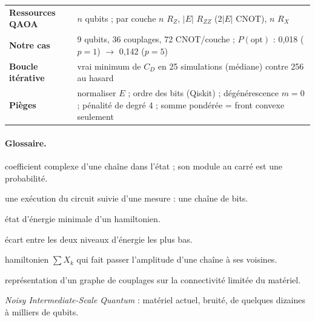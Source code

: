 \begin{center}
\begin{tabularx}{\linewidth}{>{\raggedright\arraybackslash}p{4.3cm}X}
\textbf{Ressources QAOA} & $n$ qubits ; par couche $n$ $R_Z$, $|E|$ $R_{ZZ}$ ($2|E|$ CNOT), $n$ $R_X$\\
\textbf{Notre cas} & 9 qubits, 36 couplages, 72 CNOT/couche ; $P(\text{opt})$ : 0,018 ($p=1$) $\to$ 0,142 ($p=5$)\\
\textbf{Boucle itérative} & vrai minimum de $C_D$ en 25 simulations (médiane) contre 256 au hasard\\
\textbf{Pièges} & normaliser $E$ ; ordre des bits (Qiskit) ; dégénérescence $m=0$ ; pénalité de degré 4 ; somme pondérée = front convexe seulement\\
\bottomrule
\end{tabularx}
\end{center}

\paragraph{Glossaire.}
\begin{description}[style=nextline,leftmargin=2.5cm]
\item[Amplitude] coefficient complexe d'une chaîne dans l'état ; son module au carré est une probabilité.
\item[Shot] une exécution du circuit suivie d'une mesure : une chaîne de bits.
\item[Fondamental] état d'énergie minimale d'un hamiltonien.
\item[Gap] écart entre les deux niveaux d'énergie les plus bas.
\item[Mélangeur] hamiltonien $\sum X_k$ qui fait passer l'amplitude d'une chaîne à ses voisines.
\item[Plongement] représentation d'un graphe de couplages sur la connectivité limitée du matériel.
\item[NISQ] \emph{Noisy Intermediate-Scale Quantum} : matériel actuel, bruité, de quelques dizaines à milliers de qubits.
\end{description}


